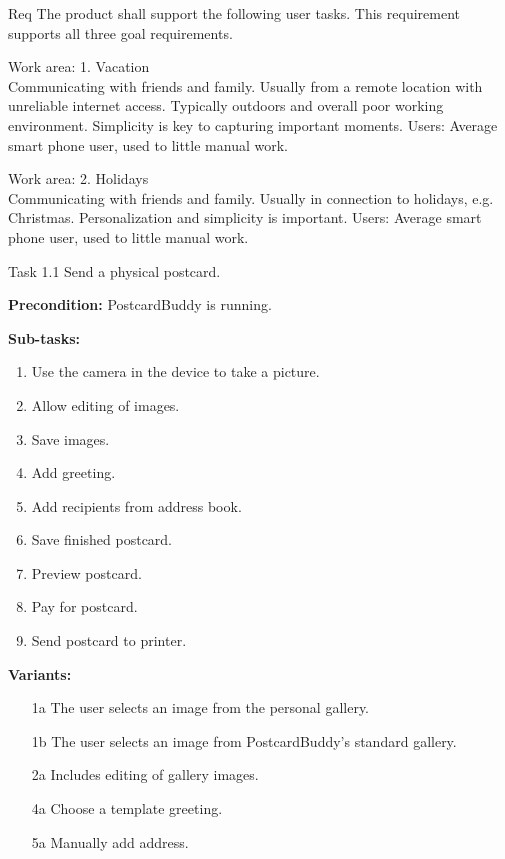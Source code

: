 \documentclass[10pt,a4paper]{article}
\begin{document}
\begin {description}

\item [Req \thesubsubsection {.\theinterf}] The product shall support the following user tasks. This requirement supports all three goal requirements.

\item[Work area: 1. Vacation] \mbox{}\\
Communicating with friends and family. Usually from a remote location with unreliable internet access. Typically outdoors and overall poor working environment. Simplicity is key to capturing important moments. \newline
Users: Average smart phone user, used to little manual work. 

\item[Work area: 2. Holidays] \mbox{}\\
Communicating with friends and family. Usually in connection to holidays, e.g. Christmas. Personalization and simplicity is important.
 \newline
Users: Average smart phone user, used to little manual work.

\item [Task 1.1] Send a physical postcard.
\begin {description}
\item \textbf{Precondition:} PostcardBuddy is running.

\item \textbf{Sub-tasks:}
\begin{enumerate}
\item Use the camera in the device to take a picture.
\item Allow editing of images.
\item Save images.
\item Add greeting.
\item Add recipients from address book. 
\item Save finished postcard.
\item Preview postcard.
\item Pay for postcard.
\item Send postcard to printer.
\end{enumerate}

\item \textbf{Variants:}
\begin{itemize}[label={}]
\item[1a] The user selects an image from the personal gallery.
\item[1b] The user selects an image from PostcardBuddy's standard gallery. 
\item[2a] Includes editing of gallery images.
\item[4a] Choose a template greeting.
\item[5a] Manually add address.
\end{itemize}
\end{description}


\end{description}
\end{document}
